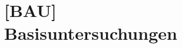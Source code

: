 \chapter[{[BAU]} Basisuntersuchungen]{[BAU]\\Basisuntersuchungen}

\minitoc







\label{topic:rr-messung}

